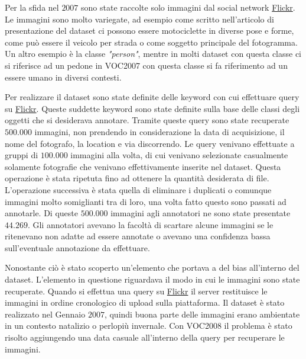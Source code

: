 Per la sfida nel $2007$ sono state raccolte solo immagini dal social network \href{https://www.flickr.com/}{Flickr}. Le immagini sono molto variegate, ad esempio come scritto nell'articolo di presentazione del dataset \cite{everingham2010pascal} ci possono essere motociclette in diverse pose e forme, come può essere il veicolo per strada o come soggetto principale del fotogramma. 
Un altro esempio è la classe \textit{"person"}, mentre in molti dataset con questa classe ci si riferisce ad un pedone in VOC2007 con questa classe si fa riferimento ad un essere umano in diversi contesti. 

Per realizzare il dataset sono state definite delle keyword con cui effettuare query su \href{https://www.flickr.com/}{Flickr}. Queste suddette keyword sono state definite sulla base delle classi degli oggetti che si desiderava annotare. Tramite queste query sono state recuperate $500.000$ immagini, non prendendo in considerazione la data di acquisizione, il nome del fotografo, la location e via discorrendo. 
Le query venivano effettuate a gruppi di $100.000$ immagini alla volta, di cui venivano selezionate casualmente solamente fotografie che venivano effettivamente inserite nel dataset. Questa operazione è stata ripetuta fino ad ottenere la quantità desiderata di file. 
L'operazione successiva è stata quella di eliminare i duplicati o comunque immagini molto somiglianti tra di loro, una volta fatto questo sono passati ad annotarle. Di queste $500.000$ immagini agli annotatori ne sono state presentate $44.269$. Gli annotatori avevano la facoltà di scartare alcune immagini se le ritenevano non adatte ad essere annotate o avevano una confidenza bassa sull'eventuale annotazione da effettuare.

Nonostante ciò è stato scoperto un'elemento che portava a del bias all'interno del dataset. L'elemento in questione riguardava il modo in cui le immagini sono state recuperate. Quando si effettua una query su \href{https://www.flickr.com/}{Flickr} il server restituisce le immagini in ordine cronologico di upload sulla piattaforma. Il dataset è stato realizzato nel Gennaio $2007$, quindi buona parte delle immagini erano ambientate in un contesto natalizio o perlopiù invernale. Con VOC2008 il problema è stato risolto aggiungendo una data casuale all'interno della query per recuperare le immagini.  

